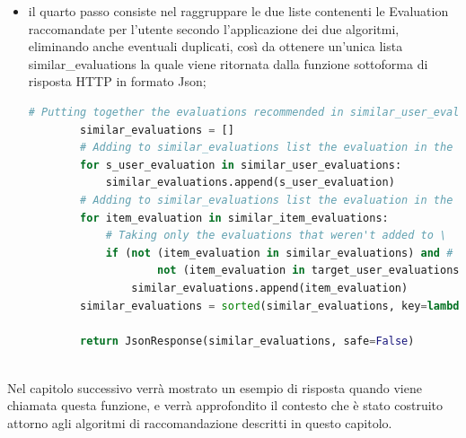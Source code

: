 \begin{itemize}
\begin{lstlisting}[language=Python, label=lst:CF_Hybrid_Evaluation_4]
				# Taking only the evaluations that have: different other_id (excluding the target evaluation
				# in the recommendation) and same parent_id and the evaluations that weren't added to 'similar_item_evaluations'
				# list or to 'similar_user_evaluations' or to 'target_user_evaluations'
				if ((t_user_evaluation['other_id'] != item_evaluation['other_id']) and # Evaluations must have different 'id'
						(t_user_evaluation['parent_id'] == item_evaluation['parent_id']) and # Evaluations must have the same 'parent_id'
						# Evaluation in all_other_evals list mustn't be already added to \
						not (item_evaluation in similar_item_evaluations) and # the 'similar_item_evaluations' list,
						not (item_evaluation in similar_user_evaluations) and # the 'similar_user_evaluations' list or
						not (item_evaluation in target_user_evaluations)): # the 'target_user_evaluations' list
					similar_item_evaluations.append(item_evaluation)
	\end{lstlisting} 
	\item il quarto passo consiste nel raggruppare le due liste contenenti le Evaluation raccomandate per l'utente secondo l'applicazione dei
	due algoritmi, eliminando anche eventuali duplicati, così da ottenere un'unica lista similar\_evaluations la quale viene ritornata dalla 
	funzione sottoforma di risposta HTTP in formato Json;
	\begin{lstlisting}[language=Python, label=lst:CF_Hybrid_Evaluation_5]
		# Putting together the evaluations recommended in similar_user_evaluations list and similar_item_evaluations list
		similar_evaluations = []
		# Adding to similar_evaluations list the evaluation in the similar_user_evaluations list
		for s_user_evaluation in similar_user_evaluations:
			similar_evaluations.append(s_user_evaluation)
		# Adding to similar_evaluations list the evaluation in the similar_item_evaluations list
		for item_evaluation in similar_item_evaluations:
			# Taking only the evaluations that weren't added to \
			if (not (item_evaluation in similar_evaluations) and # the 'similar_evaluations' list or
					not (item_evaluation in target_user_evaluations)): # the 'target_user_evaluations' list
				similar_evaluations.append(item_evaluation)
		similar_evaluations = sorted(similar_evaluations, key=lambda i: i['other_id'])

		return JsonResponse(similar_evaluations, safe=False)
	\end{lstlisting} 
\end{itemize}
\ \\
Nel capitolo successivo verrà mostrato un esempio di risposta quando viene chiamata questa funzione, e verrà approfondito il contesto che 
è stato costruito attorno agli algoritmi di raccomandazione descritti in questo capitolo.

